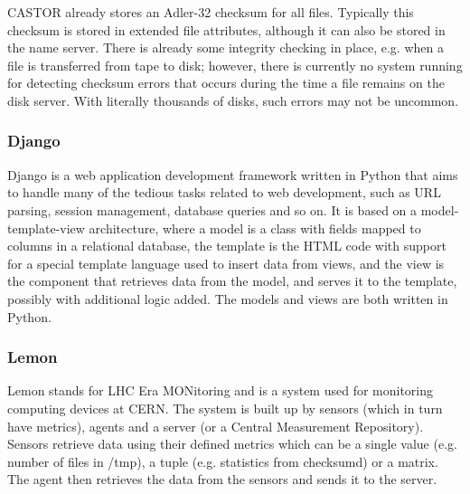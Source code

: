 CASTOR already stores an Adler-32 checksum for all files. Typically this checksum is stored in extended file attributes, although it can also be stored in the name server. There is already some integrity checking in place, e.g. when a file is transferred from tape to disk; however, there is currently no system running for detecting checksum errors that occurs during the time a file remains on the disk server. With literally thousands of disks, such errors may not be uncommon. 

\subsubsection{Django}
Django is a web application development framework written in Python that aims to handle many of the tedious tasks related to web development, such as URL parsing, session management, database queries and so on.\cite{django} It is based on a model-template-view architecture, where a model is a class with fields mapped to columns in a relational database, the template is the HTML code with support for a special template language used to insert data from views, and the view is the component that retrieves data from the model, and serves it to the template, possibly with additional logic added. The models and views are both written in Python.

\subsubsection{Lemon}
Lemon stands for LHC Era MONitoring and is a system used for monitoring computing devices at CERN. The system is built up by sensors (which in turn have metrics), agents and a server (or a Central Measurement Repository). Sensors retrieve data using their defined metrics which can be a single value (e.g. number of files in /tmp), a tuple (e.g. statistics from checksumd) or a matrix. The agent then retrieves the data from the sensors and sends it to the server. 

